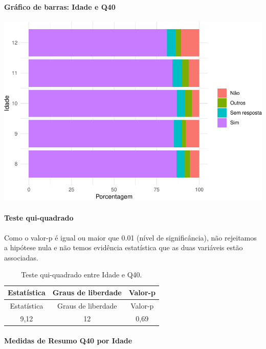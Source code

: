 \documentclass[]{article}
\let\oldparagraph\paragraph
\renewcommand{\paragraph}[1]{\oldparagraph{#1}\mbox{}}
\begin{document}
\hypertarget{gruxe1fico-de-barras-idade-e-q40}{%
\paragraph{Gráfico de barras: Idade e Q40}\label{gruxe1fico-de-barras-idade-e-q40}}

\begin{center}\includegraphics[width=0.75\linewidth]{relatorio_covid19_files/figure-latex/unnamed-chunk-1567-1} \end{center}

\hypertarget{teste-qui-quadrado-134}{%
\paragraph{Teste qui-quadrado}\label{teste-qui-quadrado-134}}

Como o valor-p é igual ou maior que 0.01 (nível de significância), não rejeitamos a hipótese nula e não temos evidência estatística que as duas variáveis estão associadas.

\begin{longtable}[]{@{}ccc@{}}
\caption{\label{tab:unnamed-chunk-1569}Teste qui-quadrado entre Idade e Q40.}\tabularnewline
\toprule
Estatística & Graus de liberdade & Valor-p\tabularnewline
\midrule
\endfirsthead
\toprule
Estatística & Graus de liberdade & Valor-p\tabularnewline
\midrule
\endhead
9,12 & 12 & 0,69\tabularnewline
\bottomrule
\end{longtable}

\cleardoublepage

\hypertarget{medidas-de-resumo-q40-por-idade}{%
\paragraph{Medidas de Resumo Q40 por Idade}\label{medidas-de-resumo-q40-por-idade}}
\end{document}
